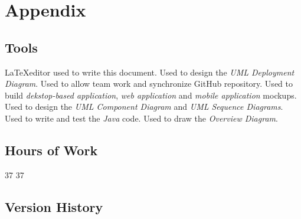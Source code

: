 \section{Appendix}
\subsection{Tools}
\begin{itemize}
	 \LaTeX editor used to write this document.
	 Used to design the \textit{UML Deployment Diagram}.
	 Used to allow team work and synchronize GitHub repository.
	 Used to build \textit{dekstop-based application}, \textit{web application} and \textit{mobile application} mockups.
	 Used to design the \textit{UML Component Diagram} and \textit{UML Sequence Diagrams}.
	 Used to write and test the \textit{Java} code.
	 Used to draw the \textit{Overview Diagram}.
\end{itemize}
\subsection{Hours of Work}
\begin{itemize}
	 37
	 37
\end{itemize}
\subsection{Version History}
